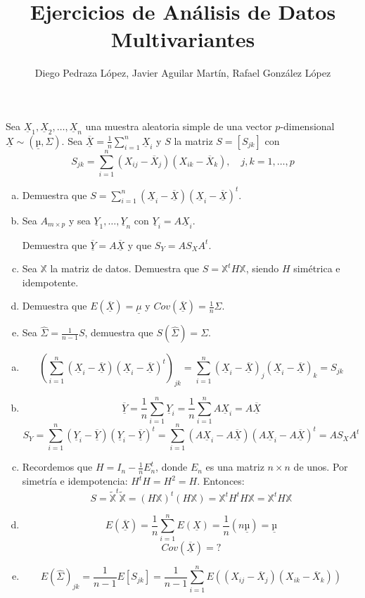\documentclass[twoside]{article}
\newcommand{\media}[1]{{\overline{#1}}}
\newcommand{\muestra}[1]{{\underline{#1}}}
\newcommand{\m}[1]{{\muestra{#1}}}
\newcommand{\mX}{{\muestra{X}}}
\begin{document}
\title{Ejercicios de Análisis de Datos Multivariantes}
\author{Diego Pedraza López, Javier Aguilar Martín, Rafael González López}
\maketitle

\begin{ejercicio}{1.1}
Sea $\mX_1, \mX_2, \dots, \mX_n$ una muestra aleatoria simple de una vector $p$-dimensional $\mX \sim (\m{µ},Σ)$.
Sea $\media{\m{X}} = \frac{1}{n}\sum_{i=1}^n \m{X}_i$ y $S$ la matriz $S = [S_{jk}]$ con
\[ S_{jk} = \sum_{i=1}^n (X_{ij} - \media{X}_j)(X_{ik}-\media{X}_k), \quad j,k=1,\dots,p\]
\begin{enumerate}[(a)]
\item Demuestra que $S = \sum_{i=1}^n (\mX_i-\media{\m{X}})(\mX_i-\media{\m{X}})^t$.
\item Sea $A_{m\times p}$ y sea $\m{Y}_1,\dots,\m{Y}_n$ con $\m{Y}_i = A \m{X}_i$.

Demuestra que $\media{\m{Y}}=A \media{\mX}$ y que $S_Y = A S_X A^t$.
\item Sea $\mathbb{X}$ la matriz de datos. Demuestra que $S = \mathbb{X}^t H \mathbb{X}$, siendo $H$ simétrica e idempotente.
\item Demuestra que $E(\media{\mX}) = \m{μ}$ y $Cov(\media{\mX}) = \frac{1}{n} Σ$.
\item Sea $\hat{Σ} = \frac{1}{n-1}S$, demuestra que $S(\hat{Σ}) = Σ$.
\end{enumerate}
\end{ejercicio}
\begin{solucion}
\begin{enumerate}[(a)]
\item
\[ \left(\sum_{i=1}^n (\mX_i-\media{\m{X}})(\mX_i-\media{\m{X}})^t\right)_{jk} = \sum_{i=1}^n (\mX_i-\media{\m{X}})_j(\mX_i-\media{\m{X}})_k = S_{jk} \]
\item
\[ \media{\m{Y}} = \frac{1}{n} \sum_{i=1}^n \m{Y}_i = \frac{1}{n} \sum_{i=1}^n A\m{X}_i = A \media{\mX} \]
\[ S_Y = \sum_{i=1}^n (\m{Y}_i-\media{\m{Y}})(\m{Y}_i-\media{\m{Y}})^t = \sum_{i=1}^n (A\mX_i-A\media{\mX})(A\mX_i-A\media{\mX})^t = A S_X A^t\]
\item Recordemos que $H = I_n - \frac{1}{n}E_n^t$, donde $E_n$ es una matriz $n \times n$ de unos. 
Por simetría e idempotencia: $H^t H = H^2 = H$. Entonces:
\[ S = \tilde{\mathbb{X}}^t\tilde{\mathbb{X}} = (H \mathbb{X})^t (H \mathbb{X}) = \mathbb{X}^t H^t H \mathbb{X} = \mathbb{X}^t H \mathbb{X} \]
\item
\[ E(\media{\mX}) = \frac{1}{n}\sum_{i=1}^n E(\mX) = \frac{1}{n} (n \m{µ}) = \m{µ} \]
\[ Cov(\media{\mX}) = ? \]
\item
\[ E(\hat{Σ})_{jk} = \frac{1}{n-1} E[S_{jk}] = \frac{1}{n-1} \sum_{i=1}^n E\left((X_{ij}-\media{X}_j)(X_{ik}-\media{X}_k)\right)\]
\end{enumerate}
\end{solucion}
\end{document}

